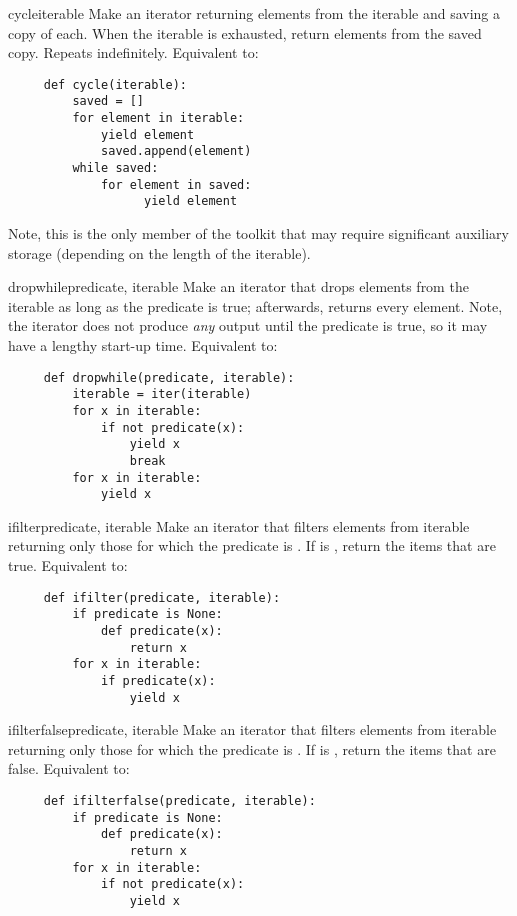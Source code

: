 \begin{funcdesc}{cycle}{iterable}
  Make an iterator returning elements from the iterable and saving a
  copy of each.  When the iterable is exhausted, return elements from
  the saved copy.  Repeats indefinitely.  Equivalent to:

  \begin{verbatim}
     def cycle(iterable):
         saved = []
         for element in iterable:
             yield element
             saved.append(element)
         while saved:
             for element in saved:
                   yield element
  \end{verbatim}

  Note, this is the only member of the toolkit that may require
  significant auxiliary storage (depending on the length of the
  iterable).
\end{funcdesc}

\begin{funcdesc}{dropwhile}{predicate, iterable}
  Make an iterator that drops elements from the iterable as long as
  the predicate is true; afterwards, returns every element.  Note,
  the iterator does not produce \emph{any} output until the predicate
  is true, so it may have a lengthy start-up time.  Equivalent to:

  \begin{verbatim}
     def dropwhile(predicate, iterable):
         iterable = iter(iterable)
         for x in iterable:
             if not predicate(x):
                 yield x
                 break
         for x in iterable:
             yield x
  \end{verbatim}
\end{funcdesc}

\begin{funcdesc}{ifilter}{predicate, iterable}
  Make an iterator that filters elements from iterable returning only
  those for which the predicate is .
  If  is , return the items that are true.
  Equivalent to:

  \begin{verbatim}
     def ifilter(predicate, iterable):
         if predicate is None:
             def predicate(x):
                 return x
         for x in iterable:
             if predicate(x):
                 yield x
  \end{verbatim}
\end{funcdesc}

\begin{funcdesc}{ifilterfalse}{predicate, iterable}
  Make an iterator that filters elements from iterable returning only
  those for which the predicate is .
  If  is , return the items that are false.
  Equivalent to:

  \begin{verbatim}
     def ifilterfalse(predicate, iterable):
         if predicate is None:
             def predicate(x):
                 return x
         for x in iterable:
             if not predicate(x):
                 yield x
  \end{verbatim}
\end{funcdesc}

